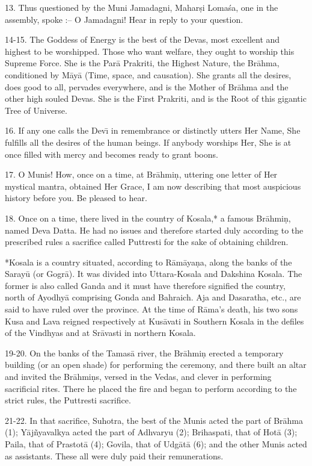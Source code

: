13. Thus questioned by the Muni Jamadagni, Mahar\d{s}i Loma\'sa, one in the assembly, spoke :-- O Jamadagni! Hear in reply to your question.

14-15. The Goddess of Energy is the best of the Devas, most excellent and highest to be worshipped. Those who want welfare, they ought to worship this Supreme Force. She is the Par\=a Prakriti, the Highest Nature, the Br\=ahma, conditioned by M\=ay\=a (Time, space, and causation). She grants all the desires, does good to all, pervades everywhere, and is the Mother of Br\=ahma and the other high souled Devas. She is the First Prakriti, and is the Root of this gigantic Tree of Universe.

16. If any one calls the Dev\={\i} in remembrance or distinctly utters Her Name, She fulfills all the desires of the human beings. If anybody worships Her, She is at once filled with mercy and becomes ready to grant boons.

17. O Munis! How, once on a time, at Br\=ahmi\d{n}, uttering one letter of Her mystical mantra, obtained Her Grace, I am now describing that most auspicious history before you. Be pleased to hear.

18. Once on a time, there lived in the country of Kosala,* a famous Br\=ahmi\d{n}, named Deva Datta. He had no issues and therefore started duly according to the prescribed rules a sacrifice called Puttresti for the sake of obtaining children.

*Kosala is a country situated, according to R\=am\=aya\d{n}a, along the banks of the Saray\=u (or Gogr\=a). It was divided into Uttara-Kosala and Dakshina Kosala. The former is also called Ganda and it must have therefore signified the country, north of Ayodhy\=a comprising Gonda and Bahraich. Aja and Dasaratha, etc., are said to have ruled over the province. At the time of R\=ama's death, his two sons Kusa and Lava reigned respectively at Kus\=avati in Southern Kosala in the defiles of the Vindhyas and at Sr\=avasti in northern Kosala.

19-20. On the banks of the Tamas\=a river, the Br\=ahmi\d{n} erected a temporary building (or an open shade) for performing the ceremony, and there built an altar and invited the Br\=ahmi\d{n}s, versed in the Vedas, and clever in performing sacrificial rites. There he placed the fire and began to perform according to the strict rules, the Puttresti sacrifice.

21-22. In that sacrifice, Suhotra, the best of the Munis acted the part of Br\=ahma (1); Y\=aj\~nyavalkya acted the part of Adhvaryu (2); Brihaspati, that of Hot\=a (3); Paila, that of Prastot\=a (4); Govila, that of Udg\=at\=a (6); and the other Munis acted as assistants. These all were duly paid their remunerations.

